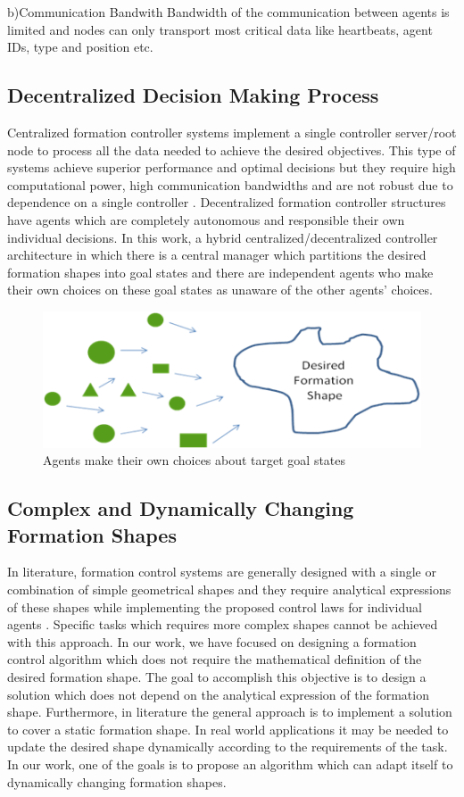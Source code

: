 b)Communication Bandwith \newline
Bandwidth of the communication between agents is limited and nodes can only transport most critical data like heartbeats, agent IDs, type and position etc.

\subsection{ Decentralized Decision Making Process}
Centralized formation controller systems implement a single controller  server/root node to process all the data needed to achieve the desired objectives. This type of systems achieve superior performance and optimal decisions  but they require high computational power, high communication bandwidths and are not robust due to dependence on a single controller \cite{12}. Decentralized formation controller structures have agents which are completely autonomous and responsible their own individual decisions. In this work, a hybrid centralized/decentralized controller architecture in which there is a central manager which partitions the desired formation shapes into goal states and there are independent agents who make their own choices on these goal states as unaware of the other agents' choices.

\begin{figure}[H]
\caption{Agents make their own choices about target goal states}
\centering
\includegraphics[scale = 0.9]{decentralized}
\end{figure} 

\subsection{Complex and Dynamically Changing Formation Shapes}
In literature, formation control systems are generally designed with a single or combination of simple geometrical shapes and they require analytical expressions of these shapes while implementing the proposed control laws for individual agents \cite{93}. Specific tasks which requires more complex shapes cannot be achieved with this approach. In our work, we have focused on designing a formation control algorithm which does not require the mathematical definition of the desired formation shape. The goal to accomplish this objective is to design a solution which does not depend on the analytical expression of the formation shape. Furthermore, in literature the general approach is to implement a solution to cover a static formation shape. In real world applications it may be needed to update the desired shape dynamically according to the requirements of the task. In our work, one of the goals is to propose an algorithm which can adapt itself to dynamically changing formation shapes.

